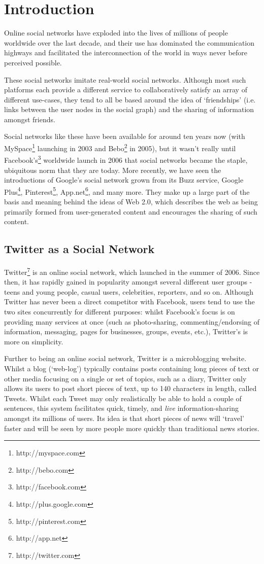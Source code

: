 \chapter{Introduction}

Online social networks have exploded into the lives of millions of people worldwide over the last decade, and their use has dominated the communication highways and facilitated the interconnection of the world in ways never before perceived possible.

These social networks imitate real-world social networks. Although most such platforms each provide a different service to collaboratively satisfy an array of different use-cases, they tend to all be based around the idea of `friendships' (i.e. links between the user nodes in the social graph) and the sharing of information amongst friends.

Social networks like these have been available for around ten years now (with MySpace\footnote{http://myspace.com} launching in 2003 and Bebo\footnote{http://bebo.com} in 2005), but it wasn't really until Facebook's\footnote{http://facebook.com} worldwide launch in 2006 that social networks became the staple, ubiquitous norm that they are today. More recently, we have seen the introductions of Google's social network grown from its Buzz service, Google Plus\footnote{http://plus.google.com}, Pinterest\footnote{http://pinterest.com}, App.net\footnote{http://app.net}, and many more. They make up a large part of the basis and meaning behind the ideas of Web 2.0, which describes the web as being primarily formed from user-generated content and encourages the sharing of such content.


\section{Twitter as a Social Network}
Twitter\footnote{http://twitter.com} is an online social network, which launched in the summer of 2006. Since then, it has rapidly gained in popularity amongst several different user groups - teens and young people, casual users, celebrities, reporters, and so on. Although Twitter has never been a direct competitor with Facebook, users tend to use the two sites concurrently for different purposes: whilst Facebook's focus is on providing many services at once (such as photo-sharing, commenting/endorsing of information, messaging, pages for businesses, groups, events, etc.), Twitter's is more on simplicity.

Further to being an online social network, Twitter is a microblogging website. Whilst a blog (`web-log') typically contains posts containing long pieces of text or other media focusing on a single or set of topics, such as  a diary, Twitter only allows its users to post short pieces of text, up to 140 characters in length, called Tweets. Whilst each Tweet may only realistically be able to hold a couple of sentences, this system facilitates quick, timely, and \textit{live} information-sharing amongst its millions of users. Its idea is that short pieces of news will `travel' faster and will be seen by more people more quickly than traditional news stories.

